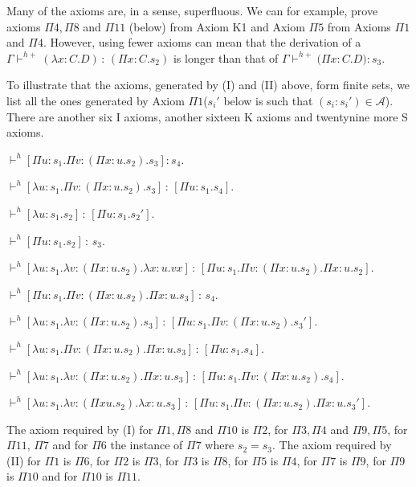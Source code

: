 \documentclass{LMCS}
\def\:{\mathbin{\,:\,}}
\begin{document}
  Many of the axioms are, in a sense, superfluous.  We can for
  example, prove axioms $\Pi 4,\Pi 8$ and $\Pi 11$ (below) from Axiom
  K1 and Axiom $\Pi 5$ from Axioms $\Pi 1$ and $\Pi 4$.  However,
  using fewer axioms can mean that the derivation of a
  $\Gamma\vdash^{h+}(\lambda x{:}C.D)\:(\Pi x{:}C.s_2)$ is longer than
  that of $\Gamma\vdash^{h+}(\Pi x{:}C.D{)}:s_3$.

  To illustrate that the axioms, generated by (I) and (II) above, form
  finite sets, we list all the ones generated by Axiom $\Pi 1$($s_i'$
  below is such that $(s_i:s_i' )\in\mathcal A$). There are another six
  I axioms, another sixteen K axioms and twentynine more S axioms.

\quad $\vdash^h [\Pi u{:}s_1  .
 \Pi v{:}(\Pi x{:}u.s_2).s_3]:s_4$.

\quad $\vdash^h [\lambda u{:}s_1 .\Pi
  v{:}(\Pi x{:}u.s_2).s_3]\:[\Pi u{:}s_1.s_4]$.

\quad $\vdash^h [\lambda u{:}s_1.s_2]
\:[\Pi u{:}s_1.s_2']$.

\quad $\vdash^h [\Pi u{:}s_1 . s_2]\:s_3$.

\quad $\vdash^h [\lambda u{:}s_1
  .\lambda v{:}(\Pi x{:}u.s_2) .\lambda x{:}u.vx]\:[\Pi u{:}s_1
  .\Pi v{:}(\Pi x{:}u.s_2) .\Pi x{:}u.s_2]$.

\quad $\vdash^h [\Pi u{:}s_1 .\Pi
  v{:}(\Pi x{:}u.s_2) .\Pi x{:}u . s_3]\:s_4$.

\quad $\vdash^h [\lambda u{:}s_1.
 \lambda v{:}(\Pi x{:}u.s_2).s_3]\:[\Pi u{:}s_1.\Pi v{:}(\Pi
  x{:}u.s_2).s_3']$.

\quad $\vdash^h [\lambda u{:}s_1
  .\Pi v{:}(\Pi x{:}u.s_2).\Pi x{:}u.s_3]\:[\Pi
  u{:}s_1.s_4]$.

\quad $\vdash^h [\lambda u{:}s_1  .\lambda
v{:}(\Pi x{:}u.s_2) .\Pi x{:}u.s_3]\:[\Pi u{:}s_1 . \Pi v{:}(\Pi
x{:}u.s_2) . s_4]$.

\quad $\vdash^h [\lambda u{:}s_1  .\lambda
v{:}(\Pi x{}u.s_2)  .\lambda x{:}u.s_3]\:[\Pi u{:}s_1.\Pi v{:}(\Pi
x{:}u.s_2).\Pi x{:}u. s_3']$.

  The axiom required by (I) for $\Pi1,\Pi8$ and $\Pi10$ is $\Pi2$,
  for $\Pi3,\Pi4$ and $\Pi9,\Pi5$, for $\Pi11$, $\Pi7$ and for
  $\Pi6$ the instance of $\Pi 7$ where $s_2 = s_3$. The axiom required
  by (II) for $\Pi1$ is $\Pi6$, for $\Pi2$ is $\Pi3$, for $\Pi3$ is
  $\Pi8$, for $\Pi5$ is $\Pi4$, for $\Pi7$ is $\Pi9$, for $\Pi9$ is
  $\Pi10$ and for $\Pi10$ is $\Pi11$.
\end{document}
